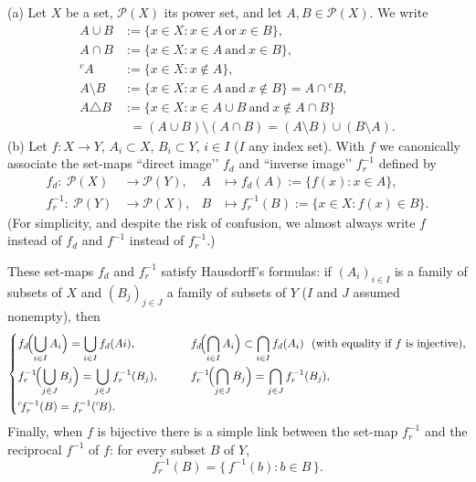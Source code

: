 \documentclass[11pt]{article}
\theoremstyle{definition}
\begin{document}
\medskip\noindent
(a) Let $X$ be a set, $\mathcal P(X)$ its power set, and let $A,B\in\mathcal P(X)$. We write
\[
\begin{aligned}
A\cup B &:= \{x\in X: x\in A\ \text{or}\ x\in B\},\\
A\cap B &:= \{x\in X: x\in A\ \text{and}\ x\in B\},\\
{}^{c}\!A &:= \{x\in X: x\notin A\},\\
A\setminus B &:= \{x\in X: x\in A\ \text{and}\ x\notin B\}=A\cap{}^{c}\!B,\\
A\triangle B &:= \{x\in X: x\in A\cup B\ \text{and}\ x\notin A\cap B\}\\
&\phantom{:}= (A\cup B)\setminus(A\cap B)=(A\setminus B)\cup(B\setminus A).
\end{aligned}
\]
\medskip\noindent
(b) Let $f:X\to Y$, $A_i\subset X$, $B_i\subset Y$, $i\in I$ ($I$ any index set). With $f$ we canonically associate the set-maps “direct image’’ $f_d$ and “inverse image’’ $f_r^{-1}$ defined by
\[
\begin{aligned}
f_d:\ \mathcal P(X) &\longrightarrow \mathcal P(Y), & A &\longmapsto f_d(A):=\{f(x):x\in A\},\\
f_r^{-1}:\ \mathcal P(Y) &\longrightarrow \mathcal P(X), & B &\longmapsto f_r^{-1}(B):=\{x\in X: f(x)\in B\}.
\end{aligned}
\]
(For simplicity, and despite the risk of confusion, we almost always write $f$ instead of $f_d$ and $f^{-1}$ instead of $f_r^{-1}$.)

These set-maps $f_d$ and $f_r^{-1}$ satisfy Hausdorff’s formulas: if $(A_i)_{i\in I}$ is a family of subsets of $X$ and $(B_j)_{j\in J}$ a family of subsets of $Y$ ($I$ and $J$ assumed nonempty), then
\[
\left\{
\begin{aligned}
&f_d\!\Bigl(\bigcup_{i\in I}A_i\Bigr)=\bigcup_{i\in I} f_d(Ai),\qquad
&&f_d\!\Bigl(\bigcap_{i\in I}A_i\Bigr)\subset\bigcap_{i\in I} f_d(A_i)\ \ \text{(with equality if $f$ is injective)},\\
&f_r^{-1}\!\Bigl(\bigcup_{j\in J}B_j\Bigr)=\bigcup_{j\in J} f_r^{-1}(B_j),\qquad
&&f_r^{-1}\!\Bigl(\bigcap_{j\in J}B_j\Bigr)=\bigcap_{j\in J} f_r^{-1}(B_j),\\
&{}^{c}\!f_r^{-1}(B)=f_r^{-1}({}^{c}\!B).
\end{aligned}
\right.
\]
Finally, when $f$ is bijective there is a simple link between the set-map $f_r^{-1}$ and the reciprocal $f^{-1}$ of $f$: for every subset $B$ of $Y$,
\[
f_r^{-1}(B)=\{\,f^{-1}(b): b\in B\,\}.
\]
\end{document}
